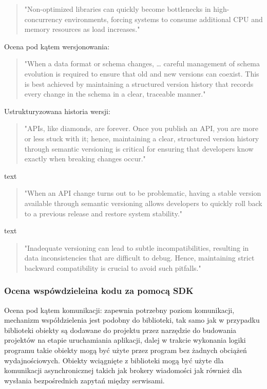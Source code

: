 \documentclass[runningheads,12pt]{llncs}
\begin{document}
\begin{quote}
    "Non-optimized libraries can quickly become bottlenecks in high-concurrency environments, forcing systems to consume additional CPU and memory resources as load increases." ~\cite[p. 192]{fowler2012patterns}
\end{quote}

Ocena pod kątem wersjonowania:

\begin{quote}
    "When a data format or schema changes, … careful management of schema evolution is required to ensure that old and new versions can coexist. This is best achieved by maintaining a structured version history that records every change in the schema in a clear, traceable manner." ~\cite[p. 111]{kleppmann2017designing}
\end{quote}

Ustrukturyzowana historia wersji:

\begin{quote}
    "APIs, like diamonds, are forever. Once you publish an API, you are more or less stuck with it; hence, maintaining a clear, structured version history through semantic versioning is critical for ensuring that developers know exactly when breaking changes occur." ~\cite[p. 75]{Essential}
\end{quote}

text

\begin{quote}
    "When an API change turns out to be problematic, having a stable version available through semantic versioning allows developers to quickly roll back to a previous release and restore system stability." ~\cite[p. 75]{Essential}
\end{quote}

text

\begin{quote}
    "Inadequate versioning can lead to subtle incompatibilities, resulting in data inconsistencies that are difficult to debug. Hence, maintaining strict backward compatibility is crucial to avoid such pitfalls." ~\cite[p. 75]{Essential}
\end{quote}

\subsubsection{Ocena wspówdzieleina kodu za pomocą SDK}

Ocena pod kątem komunikacji: zapewnia potrzebny poziom komunikacji, mechanizm współdzielenia jest podobny do biblioteki, tak samo jak w przypadku biblioteki obiekty są dodawane do projektu przez narzędzie do budowania projektów na etapie uruchamiania aplikacji, dalej w trakcie wykonania logiki programu takie obiekty mogą być użyte przez program bez żadnych obciążeń wydajnościowych. Obiekty wciągnięte z biblioteki mogą być użyte dla komunikacji asynchronicznej takich jak brokery wiadomości jak również dla wysłania bezpośrednich zapytań między serwisami.
\end{document}
